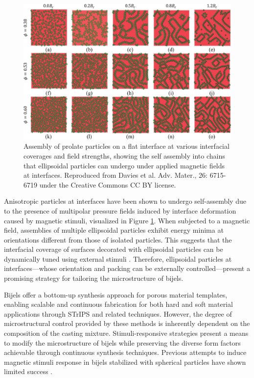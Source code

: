 \begin{figure}[h]
    \centering
    \includegraphics[scale = 0.4]{figures/introduction/anisotropic_particles_assembly.jpg}
    \caption{Assembly of prolate particles on a flat interface at various interfacial coverages and field strengths,
             showing the self assembly into chains that ellipsoidal particles can undergo under applied magnetic fields at
             interfaces. \cite{davies_assembling_2014} Reproduced from Davies et al. Adv. Mater., 26: 6715-6719 under the 
             Creative Commons CC BY license.}
    \label{fig:anisotropic_assembly}
\end{figure}

Anisotropic particles at interfaces have been shown to undergo self-assembly due to the presence of multipolar pressure fields induced by interface 
deformation caused by magnetic stimuli, visualized in Figure \ref{fig:anisotropic_assembly}. \cite{bresme_orientational_2007, davies_interface_2014}
When subjected to a magnetic field, assemblies of multiple ellipsoidal particles exhibit energy minima at orientations different from those of isolated 
particles. This suggests that the interfacial coverage of surfaces decorated with ellipsoidal particles can be dynamically tuned using external 
stimuli \cite{newton_influence_2014, newton_capillary_2018}. Therefore, ellipsoidal particles at interfaces—whose orientation and packing can be externally 
controlled—present a promising strategy for tailoring the microstructure of bijels.  

Bijels offer a bottom-up synthesis approach for porous material templates, enabling scalable and continuous fabrication for both hard and soft material 
applications through STrIPS and related techniques. However, the degree of microstructural control provided by these methods is inherently dependent on 
the composition of the casting mixture. Stimuli-responsive strategies present a means to modify the microstructure of bijels while preserving the 
diverse form factors achievable through continuous synthesis techniques. Previous attempts to induce magnetic stimuli response in bijels stabilized 
with spherical particles have shown limited success \cite{kim_bijels_2010}.  

